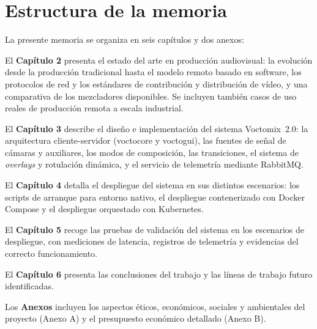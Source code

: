 \section{Estructura de la memoria}

La presente memoria se organiza en seis capítulos y dos anexos:

El \textbf{Capítulo 2} presenta el estado del arte en producción audiovisual: la
evolución desde la producción tradicional hasta el modelo remoto basado en software,
los protocolos de red y los estándares de contribución y distribución de vídeo, y una
comparativa de los mezcladores disponibles. Se incluyen también casos de uso reales de
producción remota a escala industrial.

El \textbf{Capítulo 3} describe el diseño e implementación del sistema Voctomix~2.0:
la arquitectura cliente-servidor (voctocore y voctogui), las fuentes de señal de
cámaras y auxiliares, los modos de composición, las transiciones, el sistema de
\textit{overlays} y rotulación dinámica, y el servicio de telemetría mediante RabbitMQ.

El \textbf{Capítulo 4} detalla el despliegue del sistema en sus distintos escenarios:
los scripts de arranque para entorno nativo, el despliegue contenerizado con Docker
Compose y el despliegue orquestado con Kubernetes.

El \textbf{Capítulo 5} recoge las pruebas de validación del sistema en los escenarios
de despliegue, con mediciones de latencia, registros de telemetría y evidencias del
correcto funcionamiento.

El \textbf{Capítulo 6} presenta las conclusiones del trabajo y las líneas de trabajo
futuro identificadas.

Los \textbf{Anexos} incluyen los aspectos éticos, económicos, sociales y ambientales
del proyecto (Anexo A) y el presupuesto económico detallado (Anexo B).
